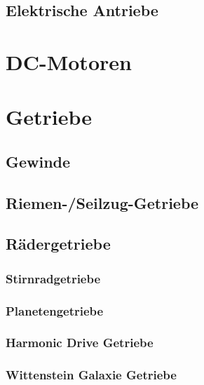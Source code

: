 \documentclass[a4paper, 11pt, accentcolor = tud3b]{tudreport}
\begin{document}
			\subsection{Elektrische Antriebe} %

		\section{DC-Motoren} %

		\section{Getriebe} %

			\subsection{Gewinde} %

			\subsection{Riemen-/Seilzug-Getriebe} %

			\subsection{Rädergetriebe} %

				\subsubsection{Stirnradgetriebe} %

				\subsubsection{Planetengetriebe} %

				\subsubsection{Harmonic Drive Getriebe} %

				\subsubsection{Wittenstein Galaxie Getriebe} %
\end{document}
